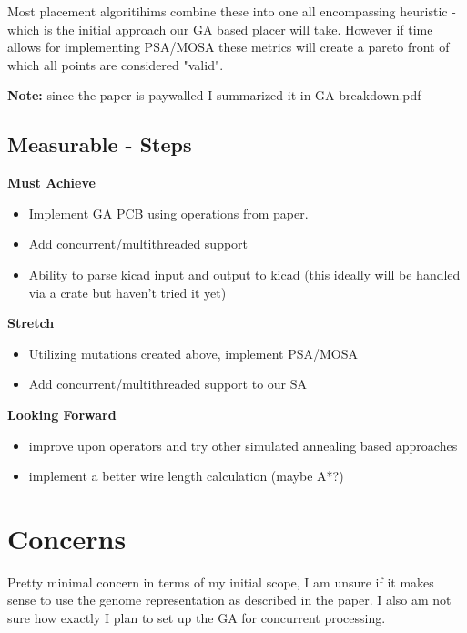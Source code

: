 \documentclass{article}
\begin{document}
Most placement algoritihims combine these into one all encompassing heuristic - which is the initial approach our GA based placer will take. However if time allows for implementing PSA/MOSA these metrics will create a pareto front of which all points are considered "valid". 

\textbf{Note:} since the paper is paywalled I summarized it in GA breakdown.pdf
\subsection{Measurable - Steps }

\noindent\textbf{Must Achieve}
\begin{itemize}

    \item Implement GA PCB using operations from paper. 
    \item Add concurrent/multithreaded support
    \item Ability to parse kicad input and output to kicad (this ideally will be handled via a crate but haven't tried it yet)
\end{itemize}


\noindent\textbf{Stretch}
\begin{itemize}
    \item Utilizing mutations created above, implement PSA/MOSA 
    \item Add concurrent/multithreaded support to our SA 
\end{itemize}

\noindent\textbf{Looking Forward}
\begin{itemize}
    \item improve upon operators and try other simulated annealing based approaches
    \item implement a better wire length calculation (maybe A*?)
\end{itemize}

\section{Concerns}
Pretty minimal concern in terms of my initial scope, I am unsure if it makes sense to use the genome representation as described in the paper. I also am not sure how exactly I plan to set up the GA for concurrent processing. 
\end{document}
